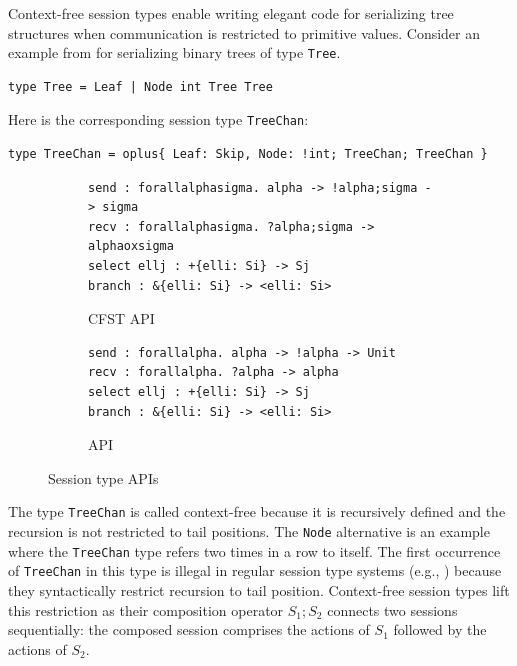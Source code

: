 Context-free session types enable writing elegant code for
serializing tree structures when communication is restricted to
primitive values.
Consider an example from \citet{DBLP:conf/icfp/ThiemannV16} for serializing binary trees of type \lstinline{Tree}.
\begin{lstlisting}
type Tree = Leaf | Node int Tree Tree
\end{lstlisting}
Here is the corresponding session type \lstinline{TreeChan}:
\begin{lstlisting}
type TreeChan = oplus{ Leaf: Skip, Node: !int; TreeChan; TreeChan }
\end{lstlisting}
\begin{figure}[tp]
  \begin{subfigure}[t]{0.49\linewidth}
\begin{lstlisting}
send : forallalphasigma. alpha -> !alpha;sigma -> sigma
recv : forallalphasigma. ?alpha;sigma -> alphaoxsigma
select ellj : +{elli: Si} -> Sj
branch : &{elli: Si} -> <elli: Si>
\end{lstlisting}
    \caption{CFST API}\label{lst:cfst-api}
  \end{subfigure}
  \begin{subfigure}[t]{0.49\linewidth}
\begin{lstlisting}[style=eclipse-new]
send : forallalpha. alpha -> !alpha -> Unit
recv : forallalpha. ?alpha -> alpha
select ellj : +{elli: Si} -> Sj
branch : &{elli: Si} -> <elli: Si>
\end{lstlisting}
    \caption{\thecalculus API}\label{lst:bcfst-api}
  \end{subfigure}
  \caption{Session type APIs}
  \label{fig:session-type-apis}
\end{figure}
The type \lstinline{TreeChan} is called context-free because it is
recursively defined and the recursion is not restricted to tail
positions. The \lstinline{Node} alternative is an example where the
\lstinline{TreeChan} type refers two times in a row to itself. The
first occurrence of \lstinline{TreeChan} in this
type is illegal in regular session type systems (e.g.,
\cite{DBLP:journals/jfp/GayV10,DBLP:conf/esop/LindleyM15,Gay_Vasconcelos_2025}) because
they syntactically restrict recursion to tail position. Context-free
session types lift this restriction as their composition operator $S_1;S_2$ connects
two sessions sequentially: the composed session comprises the
actions of $S_1$ followed by the actions of $S_2$.

